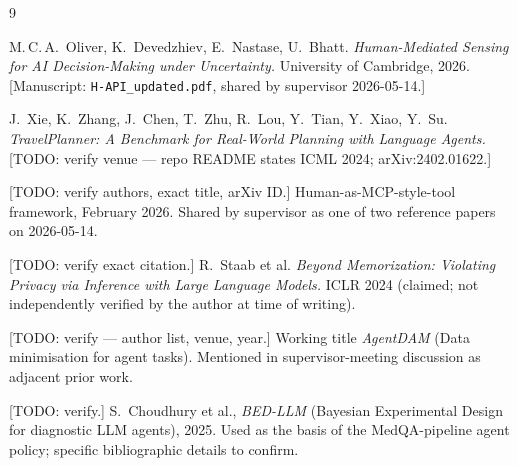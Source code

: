 \documentclass[11pt,a4paper]{article}
\begin{document}
\begin{thebibliography}{9}

M.\,C.\,A.~Oliver, K.~Devedzhiev, E.~Nastase, U.~Bhatt.
\emph{Human-Mediated Sensing for AI Decision-Making under Uncertainty.}
University of Cambridge, 2026.
[Manuscript: \texttt{H-API\_updated.pdf}, shared by supervisor 2026-05-14.]

J.~Xie, K.~Zhang, J.~Chen, T.~Zhu, R.~Lou, Y.~Tian, Y.~Xiao, Y.~Su.
\emph{TravelPlanner: A Benchmark for Real-World Planning with Language
Agents.} [TODO: verify venue --- repo README states ICML 2024;
arXiv:2402.01622.]

[TODO: verify authors, exact title, arXiv ID.]
Human-as-MCP-style-tool framework, February 2026.
Shared by supervisor as one of two reference papers on 2026-05-14.

[TODO: verify exact citation.]
R.~Staab et al.
\emph{Beyond Memorization: Violating Privacy via Inference with Large
Language Models.} ICLR 2024 (claimed; not independently verified by
the author at time of writing).

[TODO: verify --- author list, venue, year.]
Working title \emph{AgentDAM} (Data minimisation for agent tasks).
Mentioned in supervisor-meeting discussion as adjacent prior work.

[TODO: verify.]
S.~Choudhury et al., \emph{BED-LLM} (Bayesian Experimental Design for
diagnostic LLM agents), 2025. Used as the basis of the MedQA-pipeline
agent policy; specific bibliographic details to confirm.

\end{thebibliography}
\end{document}
